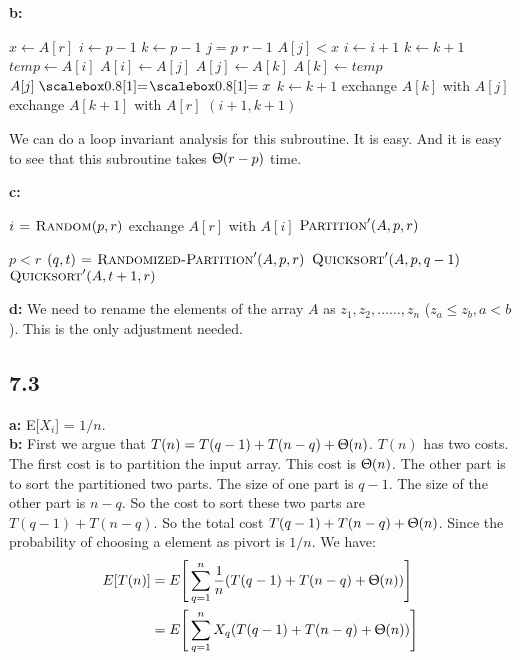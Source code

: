 \documentclass{book}
\begin{document}
\begin{CJK}{UTF8}{gkai}
\textbf{b:}
\begin{codebox}
\li $x \gets A[r]$
\li $i \gets p-1$
\li $k \gets p-1$
\li \For $j=p$ \To $r-1$
\li \Do \If $A[j] < x$
\li \Then $i \gets i+1$
\li $k \gets k+1$
\li $temp \gets A[i]$
\li $A[i] \gets A[j]$
\li $A[j] \gets A[k]$
\li $A[k] \gets temp$
\li \ElseIf $A[j] \isequal x$
\li \Then $k \gets k+1$
\li exchange $A[k]$ with $A[j]$
\End
\End
\li exchange $A[k+1]$ with $A[r]$
\li \Return $(i+1,k+1)$
\end{codebox}
We can do a loop invariant analysis for this subroutine. It is easy. And it is 
easy to see that this subroutine takes $\Uptheta(r-p)$ time.

\textbf{c:}
\begin{codebox}
\li $i \mathrel{\hspace{1pt}=\hspace{1pt}} \textnormal{\scshape Random}(p,r)$
\li exchange $A[r]$ with $A[i]$
\li \Return $\textnormal{\scshape Partition}'(A,p,r)$
\end{codebox}

\begin{codebox}
\li \If $p < r$
\li \Then $(q,t) \mathrel{\hspace{1pt}=\hspace{1pt}} \textnormal{\scshape Randomized-Partition}'(A,p,r)$
\li $\textnormal{\scshape Quicksort}'(A,p,q-1)$
\li $\textnormal{\scshape Quicksort}'(A,t+1,r)$
\End
\end{codebox}

\textbf{d:} We need to rename the elements of the array $A$ as 
$z_1,z_2,\dots\dots,z_n$ ($z_a \le z_b, a < b$). This is the only adjustment 
needed.

\subsection*{7.3} \textbf{a:} E[$X_i$] = $1/n$. \\
\textbf{b:} First we argue that $T(n) = T(q-1) + T(n-q) + \Uptheta(n)$. $T(n)$ 
has two costs. The first cost is to partition the input array. This cost is 
$\Uptheta(n)$. The other part is to sort the partitioned two parts. The size of 
one part is $q-1$. The size of the other part is $n-q$. So the cost to sort 
these two parts are $T(q-1) + T(n-q)$. So the total cost 
$T(q-1)+T(n-q)+\Uptheta(n)$. Since the probability of choosing a element as 
pivort is $1/n$. We have:
\begin{align*}
E[T(n)] &= E\Bigg[\sum_{q=1}^{n}\frac{1}{n}(T(q-1)+T(n-q)+\Uptheta(n)) \Bigg] \\
&= E\Bigg[\sum_{q=1}^{n}X_q(T(q-1)+T(n-q)+\Uptheta(n)) \Bigg]
\end{align*}


\end{CJK}
\end{document}
